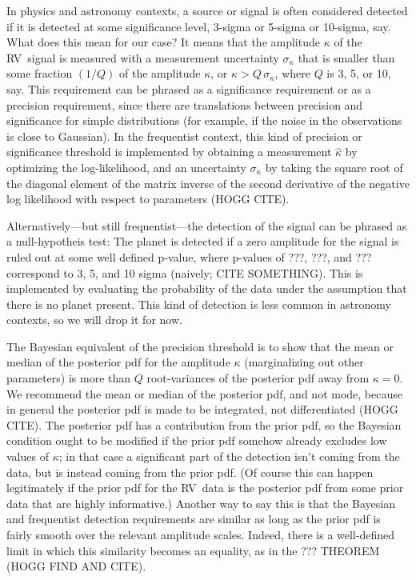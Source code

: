 \documentclass[modern]{aastex63}
\newcommand{\acronym}[1]{{\small{#1}}}
\newcommand{\rv}{\acronym{RV}}
\begin{document}
In physics and astronomy contexts, a source or signal is often
considered detected if it is detected at some significance level,
3-sigma or 5-sigma or 10-sigma, say. What does this mean for our case?
It means that the amplitude $\kappa$ of the \rv\ signal is measured
with a measurement uncertainty $\sigma_\kappa$ that is smaller than
some fraction $(1/Q)$ of the amplitude $\kappa$, or $\kappa >
Q\,\sigma_\kappa$, where $Q$ is 3, 5, or 10, say.
This requirement can be phrased as a significance requirement or as a
precision requirement, since there are translations between precision
and significance for simple distributions (for example, if the noise
in the observations is close to Gaussian).
In the frequentist context, this kind of precision or significance
threshold is implemented by obtaining a measurement $\hat{\kappa}$ by
optimizing the log-likelihood, and an uncertainty $\sigma_\kappa$ by
taking the square root of the diagonal element of the matrix inverse
of the second derivative of the negative log likelihood with respect
to parameters (HOGG CITE).

Alternatively---but still frequentist---the detection of the signal
can be phrased as a null-hypotheis test: The planet is detected if a
zero amplitude for the signal is ruled out at some well defined
p-value, where p-values of ???, ???, and ??? correspond to 3, 5, and
10 sigma (naively; CITE SOMETHING).
This is implemented by evaluating the probability of the data under
the assumption that there is no planet present.
This kind of detection is less common in astronomy contexts, so we will
drop it for now.

The Bayesian equivalent of the precision threshold is to show that the
mean or median of the posterior pdf for the amplitude $\kappa$
(marginalizing out other parameters) is more than $Q$ root-variances
of the posterior pdf away from $\kappa=0$.
We recommend the mean or median of the posterior pdf, and not mode,
because in general the posterior pdf is made to be integrated, not
differentiated (HOGG CITE).
The posterior pdf has a contribution from the prior pdf, so the Bayesian
condition ought to be modified if the prior pdf somehow already excludes
low values of $\kappa$; in that case a significant part of the detection
isn't coming from the data, but is instead coming from the prior pdf.
(Of course this can happen legitimately if the prior pdf for the \rv\ data
is the posterior pdf from some prior data that are highly informative.)
Another way to say this is that the Bayesian and frequentist detection
requirements are similar as long as the prior pdf is fairly smooth over
the relevant amplitude scales.
Indeed, there is a well-defined limit in which this similarity becomes
an equality, as in the ??? THEOREM (HOGG FIND AND CITE).
\end{document}
